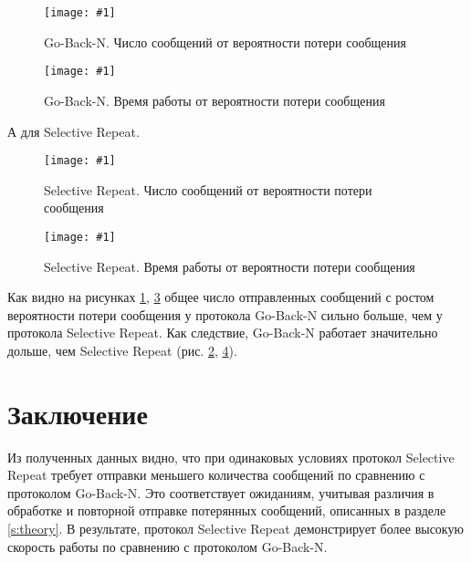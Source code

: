 \documentclass[a4paper,12pt]{article}
\newcommand{\plot}[3]{
    \begin{figure}[H]
        \begin{center}
            \texttt{[image: \#1]}
            \caption{#2}
            \label{#3}
        \end{center}
    \end{figure}
}
\begin{document}
    \plot{sizeRateGBNMessageNum}{Go-Back-N. Число сообщений от вероятности потери сообщения}{p:sizeRateGBNMessageNum}
    \plot{sizeRateGBNWorkingTime}{Go-Back-N. Время работы от вероятности потери сообщения}{p:sizeRateGBNWorkingTime}

    А для Selective Repeat.
    
    \plot{sizeRateSRPMessageNum}{Selective Repeat. Число сообщений от вероятности потери сообщения}{p:sizeRateSRPMessageNum}
    \plot{sizeRateSRPWorkingTime}{Selective Repeat. Время работы от вероятности потери сообщения}{p:sizeRateSRPWorkingTime}

    Как видно на рисунках \ref{p:sizeRateGBNMessageNum}, \ref{p:sizeRateSRPMessageNum} общее число отправленных сообщений с ростом вероятности потери сообщения
    у протокола Go-Back-N сильно больше, чем у протокола Selective Repeat.
    Как следствие, Go-Back-N работает значительно дольше, чем Selective Repeat (рис. \ref{p:sizeRateGBNWorkingTime}, \ref{p:sizeRateSRPWorkingTime}).

    \section{Заключение}
    \quad Из полученных данных видно, что при одинаковых условиях протокол Selective Repeat требует отправки меньшего количества сообщений по сравнению с протоколом Go-Back-N. Это соответствует ожиданиям, учитывая различия в обработке и повторной отправке потерянных сообщений, описанных в разделе \ref{s:theory}. В результате, протокол Selective Repeat демонстрирует более высокую скорость работы по сравнению с протоколом Go-Back-N.
\end{document}
